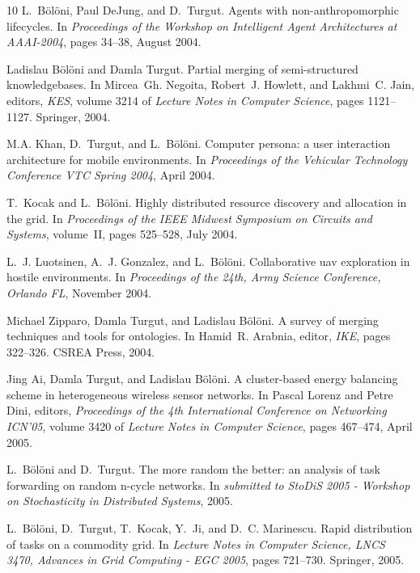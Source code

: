 \begin{thebibliography}{10}
L.~B{\"o}l{\"o}ni, Paul DeJung, and D.~Turgut.
\newblock Agents with non-anthropomorphic lifecycles.
\newblock In {\em Proceedings of the Workshop on Intelligent Agent
  Architectures at AAAI-2004}, pages 34--38, August 2004.

Ladislau B{\"o}l{\"o}ni and Damla Turgut.
\newblock Partial merging of semi-structured knowledgebases.
\newblock In Mircea~Gh. Negoita, Robert~J. Howlett, and Lakhmi~C. Jain,
  editors, {\em KES}, volume 3214 of {\em Lecture Notes in Computer Science},
  pages 1121--1127. Springer, 2004.

M.A. Khan, D.~Turgut, and L.~B{\"o}l{\"o}ni.
\newblock Computer persona: a user interaction architecture for mobile
  environments.
\newblock In {\em Proceedings of the Vehicular Technology Conference VTC Spring
  2004}, April 2004.

T.~Kocak and L.~B{\"o}l{\"o}ni.
\newblock Highly distributed resource discovery and allocation in the grid.
\newblock In {\em Proceedings of the IEEE Midwest Symposium on Circuits and
  Systems}, volume~II, pages 525--528, July 2004.

L.~J. Luotsinen, A.~J. Gonzalez, and L.~B{\"o}l{\"o}ni.
\newblock Collaborative uav exploration in hostile environments.
\newblock In {\em Proceedings of the 24th, Army Science Conference, Orlando
  FL}, November 2004.

Michael Zipparo, Damla Turgut, and Ladislau B{\"o}l{\"o}ni.
\newblock A survey of merging techniques and tools for ontologies.
\newblock In Hamid~R. Arabnia, editor, {\em IKE}, pages 322--326. CSREA Press,
  2004.

Jing Ai, Damla Turgut, and Ladislau B{\"o}l{\"o}ni.
\newblock A cluster-based energy balancing scheme in heterogeneous wireless
  sensor networks.
\newblock In Pascal Lorenz and Petre Dini, editors, {\em Proceedings of the 4th
  International Conference on Networking ICN'05}, volume 3420 of {\em Lecture
  Notes in Computer Science}, pages 467--474, April 2005.

L.~B{\"o}l{\"o}ni and D.~Turgut.
\newblock The more random the better: an analysis of task forwarding on random
  n-cycle networks.
\newblock In {\em submitted to StoDiS 2005 - Workshop on Stochasticity in
  Distributed Systems}, 2005.

L.~B{\"o}l{\"o}ni, D.~Turgut, T.~Kocak, Y.~Ji, and D.~C. Marinescu.
\newblock Rapid distribution of tasks on a commodity grid.
\newblock In {\em Lecture Notes in Computer Science, LNCS 3470, Advances in
  Grid Computing - EGC 2005}, pages 721--730. Springer, 2005.


\end{thebibliography}
